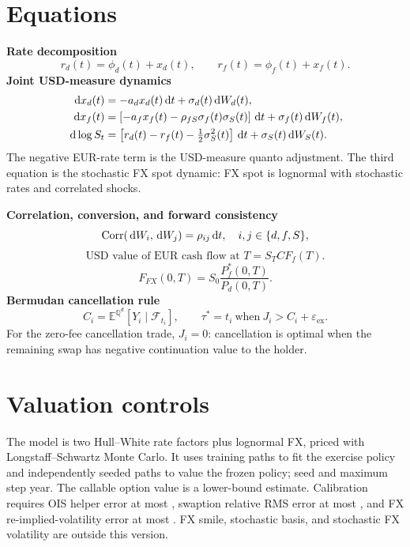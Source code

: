 {\section{Equations}
\textbf{Rate decomposition}
\[
  r_d(t)=\phi_d(t)+x_d(t),\qquad r_f(t)=\phi_f(t)+x_f(t).
\]
\textbf{Joint USD-measure dynamics}
\begin{align}
  \,\mathrm{d} x_d(t) &= -a_d x_d(t)\,\mathrm{d} t+\sigma_d(t)\,\mathrm{d} W_d(t),\\
  \,\mathrm{d} x_f(t) &= \left[-a_f x_f(t)-\rho_{fS}\sigma_f(t)\sigma_S(t)\right]\,\mathrm{d} t
                    +\sigma_f(t)\,\mathrm{d} W_f(t),\\
  \,\mathrm{d}\log S_t &= \left[r_d(t)-r_f(t)-\tfrac12\sigma_S^2(t)\right]\,\mathrm{d} t
                    +\sigma_S(t)\,\mathrm{d} W_S(t).
\end{align}
The negative EUR-rate term is the USD-measure quanto adjustment. The third
equation is the stochastic FX spot dynamic: FX spot is lognormal with
stochastic rates and correlated shocks.

\textbf{Correlation, conversion, and forward consistency}
\[
  \operatorname{Corr}(\,\mathrm{d} W_i,\,\mathrm{d} W_j)=\rho_{ij}\,\mathrm{d} t,
  \quad i,j\in\{d,f,S\},
\]
\[
  \text{USD value of EUR cash flow at }T=S_TCF_f(T).
\]
\[
  F_{FX}(0,T)=S_0\frac{P_f^*(0,T)}{P_d(0,T)}.
\]
\textbf{Bermudan cancellation rule}
\[
  C_i=\mathbb{E}^{\mathbb{Q}^d}\!\left[Y_i\mid\mathcal{F}_{t_i}\right],
  \qquad \tau^*=t_i\ \text{when}\ J_i>C_i+\varepsilon_{\mathrm{ex}}.
\]
For the zero-fee cancellation trade, $J_i=0$: cancellation is optimal when the
remaining swap has negative continuation value to the holder.

\section{Valuation controls}
The model is two Hull--White rate factors plus lognormal FX, priced with
Longstaff--Schwartz Monte Carlo. It uses \TGIRTrainingPaths{} training paths
to fit the exercise policy and \TGIRPricingPaths{} independently seeded paths
to value the frozen policy; seed \TGIRRandomSeed{} and maximum step
\TGIRMaximumStepYears{} year. The callable option value is a lower-bound
estimate. Calibration requires OIS helper error at most
\TGIRCalibrationOISLimit, swaption relative RMS error at most
\TGIRCalibrationSwaptionLimit, and FX re-implied-volatility error at most
\TGIRCalibrationFXLimit. FX smile, stochastic basis, and stochastic FX
volatility are outside this version.
}

\let\TGIRReferenceFinish\relax
\ifTGIRReferenceStandalone
  \documentclass[conference]{IEEEtran}
  
  \usepackage{amsmath,amssymb,mathtools}
  \usepackage{microtype}
  \title{\TGIRReferenceTitle}
  \TGIRSetArticlePublicationDate{\TGIRReferenceDate}
  \author{\TGIRArticleAuthorBlock}
  
  \TGIRReferenceRender
  \def\TGIRReferenceFinish{}
\fi
\TGIRReferenceFinish
